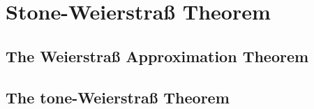 \chapter{Stone-Weierstra{\ss} Theorem}

\section{The Weierstra{\ss} Approximation Theorem}



\section{The tone-Weierstra{\ss} Theorem}



